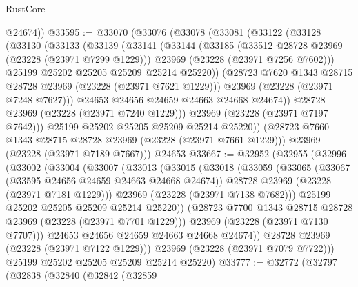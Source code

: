 \begin{lexlean}{RustCore}
\begin{coremodule}
        @24674))
@33595 := @33070
    (@33076
      (@33078
        (@33081
          (@33122
            (@33128
              (@33130
                (@33133
                  (@33139
                    (@33141
                      (@33144
                        (@33185
                          (@33512 @28728 @23969 (@23228 (@23971 @7299 @1229)))
                          @23969
                          (@23228 (@23971 @7256 @7602)))
                        @25199
                        @25202
                        @25205
                        @25209
                        @25214
                        @25220))
                    (@28723 @7620 @1343 @28715 @28728 @23969 (@23228 (@23971 @7621 @1229)))
                    @23969
                    (@23228 (@23971 @7248 @7627)))
                  @24653
                  @24656
                  @24659
                  @24663
                  @24668
                  @24674))
              @28728
              @23969
              (@23228 (@23971 @7240 @1229)))
            @23969
            (@23228 (@23971 @7197 @7642)))
          @25199
          @25202
          @25205
          @25209
          @25214
          @25220))
      (@28723 @7660 @1343 @28715 @28728 @23969 (@23228 (@23971 @7661 @1229)))
      @23969
      (@23228 (@23971 @7189 @7667)))
    @24653
@33667 := @32952
    (@32955
      (@32996
        (@33002
          (@33004
            (@33007
              (@33013
                (@33015
                  (@33018
                    (@33059
                      (@33065
                        (@33067 (@33595 @24656 @24659 @24663 @24668 @24674))
                        @28728
                        @23969
                        (@23228 (@23971 @7181 @1229)))
                      @23969
                      (@23228 (@23971 @7138 @7682)))
                    @25199
                    @25202
                    @25205
                    @25209
                    @25214
                    @25220))
                (@28723 @7700 @1343 @28715 @28728 @23969 (@23228 (@23971 @7701 @1229)))
                @23969
                (@23228 (@23971 @7130 @7707)))
              @24653
              @24656
              @24659
              @24663
              @24668
              @24674))
          @28728
          @23969
          (@23228 (@23971 @7122 @1229)))
        @23969
        (@23228 (@23971 @7079 @7722)))
      @25199
      @25202
      @25205
      @25209
      @25214
      @25220)
@33777 := @32772
    (@32797
      (@32838
        (@32840
          (@32842
            (@32859

\end{coremodule}
\end{lexlean}
